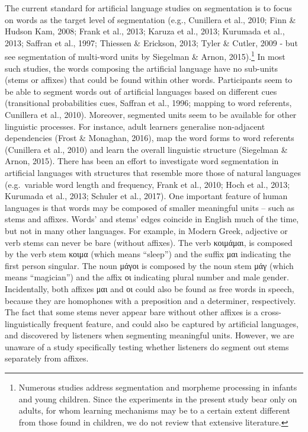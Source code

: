\documentclass[
  american,
  ,man,floatsintext]{apa6}
\begin{document}
The current standard for artificial language studies on segmentation is to focus on words as the target level of segmentation (e.g., Cunillera et al., 2010; Finn \& Hudson Kam, 2008; Frank et al., 2013; Karuza et al., 2013; Kurumada et al., 2013; Saffran et al., 1997; Thiessen \& Erickson, 2013; Tyler \& Cutler, 2009 - but see segmentation of multi-word units by Siegelman \& Arnon, 2015).\footnote{Numerous studies address segmentation and morpheme processing in infants and young children. Since the experiments in the present study bear only on adults, for whom learning mechanisms may be to a certain extent different from those found in children, we do not review that extensive literature.} In most such studies, the words composing the artificial language have no sub-units (stems or affixes) that could be found within other words. Participants seem to be able to segment words out of artificial languages based on different cues (transitional probabilities cues, Saffran et al., 1996; mapping to word referents, Cunillera et al., 2010). Moreover, segmented units seem to be available for other linguistic processes. For instance, adult learners generalise non-adjacent dependencies (Frost \& Monaghan, 2016), map the word forms to word referents (Cunillera et al., 2010) and learn the overall linguistic structure (Siegelman \& Arnon, 2015). There has been an effort to investigate word segmentation in artificial languages with structures that resemble more those of natural languages (e.g.~variable word length and frequency, Frank et al., 2010; Hoch et al., 2013; Kurumada et al., 2013; Schuler et al., 2017). One important feature of human languages is that words may be composed of smaller meaningful units -- such as stems and affixes. Words' and stems' edges coincide in English much of the time, but not in many other languages. For example, in Modern Greek, adjective or verb stems can never be bare (without affixes). The verb κοιμάμαι, is composed by the verb stem κοιμα (which means ``sleep'') and the suffix μαι indicating the first person singular. The noun μάγοι is composed by the noun stem μάγ (which means ``magician'') and the affix οι indicating plural number and male gender. Incidentally, both affixes μαι and οι could also be found as free words in speech, because they are homophones with a preposition and a determiner, respectively. The fact that some stems never appear bare without other affixes is a cross-linguistically frequent feature, and could also be captured by artificial languages, and discovered by listeners when segmenting meaningful units. However, we are unaware of a study specifically testing whether listeners do segment out stems separately from affixes.
\end{document}
